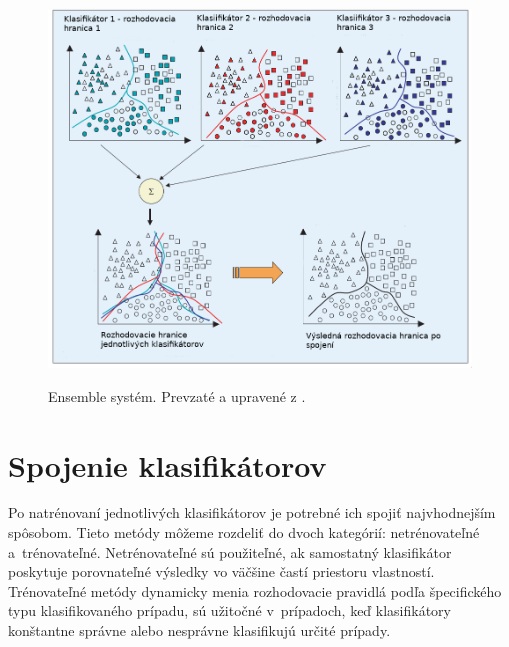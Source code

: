 \begin{figure}[H]
	\centering
	\begin{center}
		\scalebox{0.4}
		{   
			\includegraphics{ensemble.png}
		}
		\caption[ensemble]{Ensemble systém. Prevzaté a upravené z \cite{polikar}.}
		\label{ensemble}	
\end{center}
\end{figure}

\section{Spojenie klasifikátorov}

Po natrénovaní jednotlivých klasifikátorov je potrebné ich spojiť najvhodnejším spôsobom. Tieto metódy môžeme rozdeliť do dvoch kategórií: netrénovateľné a~trénovateľné. Netrénovateľné sú použiteľné, ak samostatný klasifikátor poskytuje porovnateľné výsledky vo väčšine častí priestoru vlastností. Trénovateľné metódy dynamicky menia rozhodovacie pravidlá podľa špecifického typu klasifikovaného prípadu, sú užitočné v~prípadoch, keď klasifikátory konštantne správne alebo nesprávne klasifikujú určité prípady.

